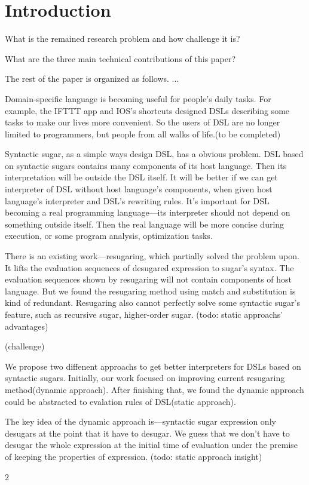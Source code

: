 \section{Introduction}



What is the remained research problem and how challenge it is?


What are the three main technical contributions of this paper?

The rest of the paper is organized as follows. ...

Domain-specific language\cite{dsl} is becoming useful for people's daily tasks. For example, the IFTTT app and IOS's shortcuts designed DSLs describing some tasks to make our lives more convenient. So the users of DSL are no longer limited to programmers, but people from all walks of life.(to be completed)

Syntactic sugar\cite{syntacticsugar}, as a simple ways design DSL, has a obvious problem. DSL based on syntactic sugars contains many components of its host language. Then its interpretation will be outside the DSL itself. It will be better if we can get interpreter of DSL without host language's components, when given host language's interpreter and DSL's rewriting rules. It's important for DSL becoming a real programming language---its interpreter should not depend on something outside itself. Then the real language will be more concise during execution, or some program analysis, optimization tasks.

There is an existing work---resugaring\cite{resugaring}\cite{hygienic}, which partially solved the problem upon. It lifts the evaluation sequences of desugared expression to sugar's syntax. The evaluation sequences shown by resugaring will not contain components of host language. But we found the resugaring method using match and substitution is kind of redundant. Resugaring also cannot perfectly solve some syntactic sugar's feature, such as recursive sugar, higher-order sugar.  (todo: static approachs' advantages)

(challenge)


We propose two diffenent approachs to get better interpreters for DSLs based on syntactic sugars. Initially, our work focused on improving current resugaring method(dynamic approach). After finishing that, we found the dynamic approach could be abstracted to evalation rules of DSL(static approach). 

The key idea of the dynamic approach is---syntactic sugar expression only desugars at the point that it have to desugar. We guess that we don't have to desugar the whole expression at the initial time of evaluation under the premise of keeping the properties of expression. (todo: static approach insight)

2